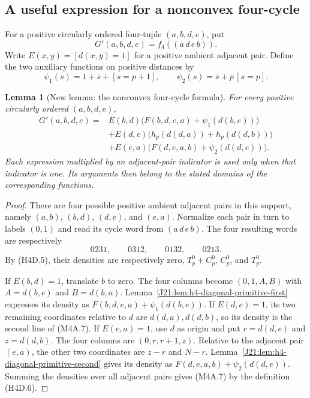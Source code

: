 \documentclass[11pt,oneside]{report}
\newtheorem{lemma}[theorem]{Lemma}
\theoremstyle{definition}
\numberwithin{equation}{section}
\begin{document}
\subsection{A useful expression for a nonconvex four-cycle}

For a positive circularly ordered four-tuple $(a,b,d,e)$, put
\[
                   G'(a,b,d,e)=f_4((a\,d\,e\,b)).
\]
Write $E(x,y)=[d(x,y)=1]$ for a positive ambient adjacent pair.
Define the two auxiliary functions on positive distances by
\[
 \psi_1(s)=1+\overline s+[s=p+1],\qquad
 \psi_2(s)=\overline s+\overline p\,[s=p].
 \tag{M4A.6}
\]

\begin{lemma}[New lemma: the nonconvex four-cycle formula]
\label{J21:lem:h4-A-four-coefficient}
For every positive circularly ordered $(a,b,d,e)$,
\begin{align*}
 G'(a,b,d,e)={}&
 E(b,d)\bigl(F(b,d,e,a)+\psi_1(d(b,e))\bigr)\\
 &+E(d,e)\bigl(h_p(d(d,a))+h_p(d(d,b))\bigr)\\
 &+E(e,a)\bigl(F(d,e,a,b)+\psi_2(d(d,e))\bigr).
 \tag{M4A.7}
\end{align*}
Each expression multiplied by an adjacent-pair indicator is used
only when that indicator is one.
Its arguments then belong to the stated domains of the corresponding
functions.
\end{lemma}
\begin{proof}
There are four possible positive ambient adjacent pairs in this
support, namely $(a,b)$, $(b,d)$, $(d,e)$, and $(e,a)$.
Normalize each pair in turn to labels $(0,1)$ and read its cycle word
from $(a\,d\,e\,b)$.
The four resulting words are respectively
\[
                        0231,\qquad0312,\qquad0132,\qquad0213.
\]
By (H4D.5), their densities are respectively zero,
$T_p^0+C_p^0$, $C_p^0$, and $T_p^0$.

If $E(b,d)=1$, translate $b$ to zero.
The four columns become $(0,1,A,B)$ with
$A=d(b,e)$ and $B=d(b,a)$.
Lemma~\ref{J21:lem:h4-diagonal-primitive-first} expresses its density as
$F(b,d,e,a)+\psi_1(d(b,e))$.
If $E(d,e)=1$, its two remaining coordinates relative to $d$
are $d(d,a),d(d,b)$, so its density is the second line of (M4A.7).
If $E(e,a)=1$, use $d$ as origin and put
$r=d(d,e)$ and $z=d(d,b)$.
The four columns are $(0,r,r+1,z)$.
Relative to the adjacent pair $(e,a)$, the other two coordinates
are $z-r$ and $N-r$.
Lemma~\ref{J21:lem:h4-diagonal-primitive-second} gives its density as
$F(d,e,a,b)+\psi_2(d(d,e))$.
Summing the densities over all adjacent pairs gives (M4A.7) by the
definition (H4D.6).
\end{proof}
\end{document}

